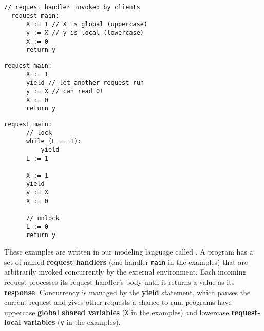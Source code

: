 \noindent
\begin{minipage}[t]{0.55\textwidth}
	\begin{minipage}[t]{\textwidth}
		\begin{lstlisting}[caption={Without yield or lock (serializable)},
			label={lst:MotivatingExample1Ser}]
  // request handler invoked by clients          
  request main: 
      X := 1 // X is global (uppercase)
      y := X // y is local (lowercase)
      X := 0
      return y 
		\end{lstlisting}
	\end{minipage}
	\vspace{1em}
	\begin{minipage}[t]{\textwidth}
		\begin{lstlisting}[caption={With yield (not serializable)},
			label={lst:MotivatingExample2NonSer}]
  request main: 
      X := 1 
      yield // let another request run
      y := X // can read 0!
      X := 0
      return y 	
		\end{lstlisting}
	\end{minipage}
\end{minipage}%
\hfill
\begin{minipage}[t]{0.35\textwidth}
	\begin{lstlisting}[caption={With yield and lock (serializable)},
		label={lst:MotivatingExample3Ser}]
  request main: 
      // lock
      while (L == 1): 
          yield
      L := 1 

      X := 1
      yield
      y := X 
      X := 0

      // unlock    
      L := 0
      return y 
	\end{lstlisting}
\end{minipage}

These examples are written in our modeling language called \toolname.
A \toolname{} program has a set of named \textbf{request handlers} (one handler \texttt{main} in the examples) that are arbitrarily invoked concurrently by the external environment.
Each incoming request processes its request handler's body until it returns a value as its \textbf{response}. Concurrency is managed by the \textbf{yield} statement, which pauses the current request and gives other requests a chance to run. \toolname{} programs have uppercase \textbf{global shared variables} (\texttt{X} in the examples) and lowercase \textbf{request-local variables} (\texttt{y} in the examples).



